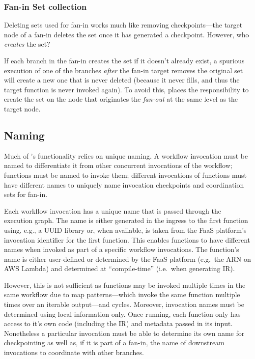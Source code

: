 \subsubsection{Fan-in Set collection}

Deleting sets used for fan-in works much like removing checkpoints---the target
node of a fan-in deletes the set once it has generated a checkpoint. However,
who \emph{creates} the set?

If each branch in the fan-in creates the set if it doesn't already exist, a
spurious execution of one of the branches \emph{after} the fan-in target removes
the original set will create a new one that is never deleted (because it never
fills, and thus the target function is never invoked again). To avoid this,
\name{} places the responsibility to create the set on the node that originates
the \emph{fan-out} at the same level as the target node.

\subsection{Naming}\label{sec:design:naming}

Much of \name{}'s functionality relies on unique naming. A workflow invocation
must be named to differentiate it from other concurrent invocations of the
workflow; functions must be named to invoke them; different invocations of
functions must have different names to uniquely name invocation checkpoints and
coordination sets for fan-in.

Each workflow invocation has a unique name that is passed through the execution
graph. The name is either generated in the ingress to the first function using,
e.g., a UUID library or, when available, is taken from the FaaS platform's
invocation identifier for the first function. This enables functions to have
different names when invoked as part of a specific workflow invocations. The
function's name is either user-defined or determined by the FaaS platform (e.g.\
the ARN on AWS Lambda) and determined at ``compile-time'' (i.e.\ when generating
\name{} IR).

However, this is not sufficient as functions may be invoked multiple times in
the same workflow due to map patterns---which invoke the same function multiple
times over an iterable output---and cycles. Moreover, invocation names must be
determined using local information only. Once running, each function only has
access to it's own code (including the IR) and metadata passed in its input.
Nonetheless a particular invocation must be able to determine its own name for
checkpointing as well as, if it is part of a fan-in, the name of downstream
invocations to coordinate with other branches.

